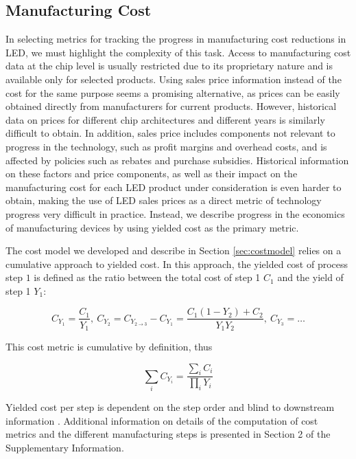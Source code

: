 \documentclass[journal=jacsat,manuscript=article]{achemso}
\begin{document}
\subsection{Manufacturing Cost}

In selecting metrics for tracking the progress in manufacturing cost reductions in LED, we must  highlight the complexity of this task. Access to manufacturing cost data at the chip level is usually restricted due to its proprietary nature and is available only for selected products. Using sales price information instead of the cost for the same purpose seems a promising alternative, as prices can be easily obtained directly from manufacturers for current products. However, historical data on prices for different chip architectures and different years is similarly difficult to obtain. In addition, sales price includes components not relevant to progress in the technology, such as profit margins and overhead costs, and is affected by policies such as rebates and purchase subsidies. Historical information on these factors and price components, as well as their impact on the manufacturing cost for each LED product under consideration is even harder to obtain, making the use of LED sales prices as a direct metric of technology progress very difficult in practice. Instead, we describe progress in the economics of manufacturing devices by using yielded cost as the primary metric.

The cost model we developed and describe in Section \ref{sec:costmodel} relies on a cumulative approach to yielded cost\cite{becker2001use}. In this approach, the yielded cost of process step $1$ is defined as the ratio between the total cost of step 1 $C_1$ and the yield of step 1 $Y_1$:

\begin{equation}
    C_{Y_1} = \frac{C_1}{Y_1}, \ C_{Y_2} = C_{Y_{2 \rightarrow 3}} - C_{Y_1} = \frac{C_1(1-Y_2)+C_2}{Y_1Y_2}, \ C_{Y_3}=\dots
\end{equation}

This cost metric is cumulative by definition, thus

\begin{equation}
    \sum_i C_{Y_i} = \frac{\sum_i C_i}{\prod_i Y_i}
\end{equation}

Yielded cost per step is dependent on the step order and blind to downstream information \cite{becker2001use}. Additional information on details of the computation of cost metrics and the different manufacturing steps is presented in Section 2 of the Supplementary Information.
\end{document}
